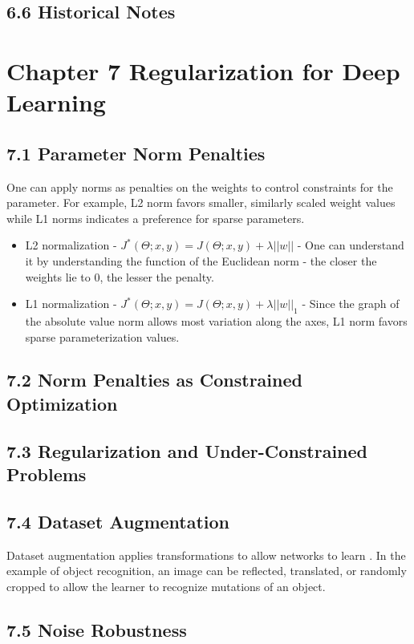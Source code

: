 \documentclass[a4paper]{report}
\begin{document}
\subsection{6.6 Historical Notes}

\section{Chapter 7 Regularization for Deep Learning}
\subsection{7.1 Parameter Norm Penalties}
One can apply norms as penalties on the weights to control constraints for the parameter. For example, L2 norm favors smaller, similarly scaled weight values while L1 norms indicates a preference for sparse parameters.
\begin{itemize}
    \item L2 normalization - $J^*(\Theta;x,y)=J(\Theta;x,y)+\lambda ||w||$ - One can understand it by understanding the function of the Euclidean norm - the closer the weights lie to 0, the lesser the penalty.
    \item L1 normalization - $J^*(\Theta;x,y)=J(\Theta;x,y)+\lambda ||w||_1$ - Since the graph of the absolute value norm allows most variation along the axes, L1 norm favors sparse parameterization values.
\end{itemize}

\subsection{7.2 Norm Penalties as Constrained Optimization}
\subsection{7.3 Regularization and Under-Constrained Problems}


\subsection{7.4 Dataset Augmentation}
Dataset augmentation applies transformations to allow networks to learn . In the example of object recognition, an image can be reflected, translated, or randomly cropped to allow the learner to recognize mutations of an object.

\subsection{7.5 Noise Robustness}
\end{document}

